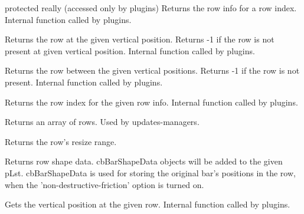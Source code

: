protected really (accessed only by plugins) Returns the row info for a row index. Internal function called by plugins.


\label{cbdockpanegetrowat}


Returns the row at the given vertical position.
Returns -1 if the row is not present at given vertical position.
Internal function called by plugins.



Returns the row between the given vertical positions.
Returns -1 if the row is not present.
Internal function called by plugins.


\label{cbdockpanegetrowindex}


Returns the row index for the given row info.  Internal function called by plugins.


\label{cbdockpanegetrowlist}


Returns an array of rows. Used by updates-managers.


\label{cbdockpanegetrowresizerange}


Returns the row's resize range.


\label{cbdockpanegetrowshapedata}


Returns row shape data.
cbBarShapeData objects will be added to the given pLst.
cbBarShapeData is used for storing the original bar's positions in the row,
when the 'non-destructive-friction' option is turned on.


\label{cbdockpanegetrowy}


Gets the vertical position at the given row.
Internal function called by plugins.


